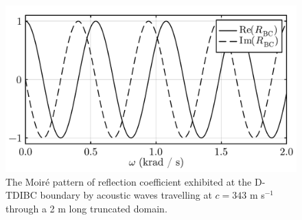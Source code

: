 \begin{figure}[t]
\centering
\includegraphics[scale=0.35]{assets/graphs/complex_R_Moire.pdf}
\caption{The Moiré pattern of reflection coefficient exhibited at the D-TDIBC boundary by acoustic waves travelling at $c=343$ m s$^{-1}$ through a 2 m long truncated domain.}
\label{fig:moire}
\end{figure}

